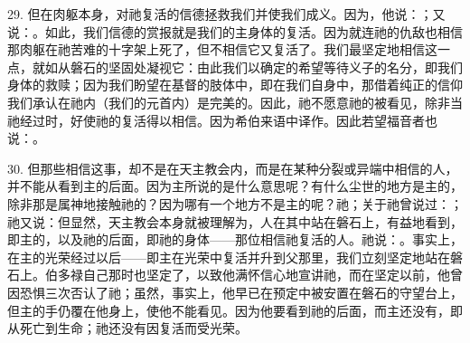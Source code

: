 29. 但在肉躯本身，对祂复活的信德拯救我们并使我们成义。因为，他说：；又说：。如此，我们信德的赏报就是我们的主身体的复活。因为就连祂的仇敌也相信那肉躯在祂苦难的十字架上死了，但不相信它又复活了。我们最坚定地相信这一点，就如从磐石的坚固处凝视它：由此我们以确定的希望等待义子的名分，即我们身体的救赎；因为我们盼望在基督的肢体中，即在我们自身中，那借着纯正的信仰我们承认在祂内（我们的元首内）是完美的。因此，祂不愿意祂的被看见，除非当祂经过时，好使祂的复活得以相信。因为希伯来语中译作。因此若望福音者也说：。\par

30. 但那些相信这事，却不是在天主教会内，而是在某种分裂或异端中相信的人，并不能从看到主的后面。因为主所说的是什么意思呢？有什么尘世的地方是主的，除非那是属神地接触祂的？因为哪有一个地方不是主的呢？祂；关于祂曾说过：；祂又说：但显然，天主教会本身就被理解为，人在其中站在磐石上，有益地看到，即主的，以及祂的后面，即祂的身体——那位相信祂复活的人。祂说：。事实上，在主的光荣经过以后——即主在光荣中复活并升到父那里，我们立刻坚定地站在磐石上。伯多禄自己那时也坚定了，以致他满怀信心地宣讲祂，而在坚定以前，他曾因恐惧三次否认了祂；虽然，事实上，他早已在预定中被安置在磐石的守望台上，但主的手仍覆在他身上，使他不能看见。因为他要看到祂的后面，而主还没有，即从死亡到生命；祂还没有因复活而受光荣。\par

